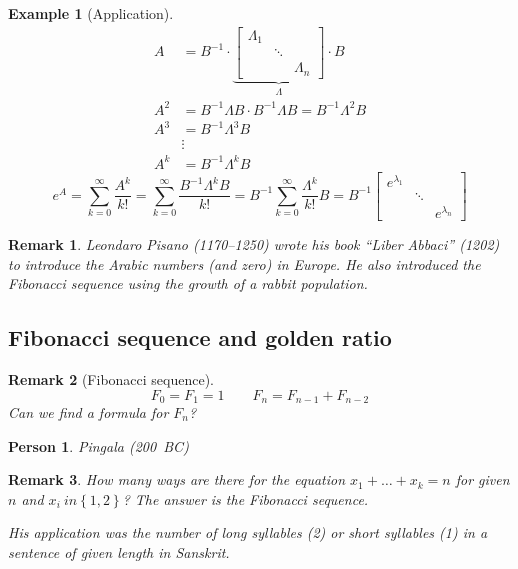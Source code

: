 \documentclass[a4paper]{article}
\numberwithin{lecref}{section}
\newtheorem*{Example}{Example}
\newtheorem*{Remark}{Remark}
\newtheorem*{Person}{Person}
\newcommand{\set}[1]{\left\{#1\right\}}
\begin{document}
\begin{Example}[Application]
  \begin{align*}
    A &= B^{-1} \cdot \underbrace{\begin{bmatrix} \Lambda_1 & & \\ & \ddots & \\ & & \Lambda_n \end{bmatrix}}_{\Lambda} \cdot B \\
    A^2 &= B^{-1} \Lambda B \cdot B^{-1} \Lambda B = B^{-1} \Lambda^2 B \\
    A^3 &= B^{-1} \Lambda^3 B \\
        & \vdots \\
    A^k &= B^{-1} \Lambda^k B
  \end{align*}
  \[ e^A = \sum_{k=0}^\infty \frac{A^k}{k!} = \sum_{k=0}^\infty \frac{B^{-1} \Lambda^k B}{k!} = B^{-1} \sum_{k=0}^\infty \frac{\Lambda^k}{k!} B = B^{-1} \begin{bmatrix} e^{\lambda_1} & & \\ & \ddots & \\ & & e^{\lambda_n} \end{bmatrix} \]
\end{Example}

\begin{Remark}
  Leondaro Pisano (1170--1250) wrote his book \enquote{Liber Abbaci} (1202) to introduce the Arabic numbers (and zero) in Europe.
  He also introduced the Fibonacci sequence using the growth of a rabbit population.
\end{Remark}

\subsection{Fibonacci sequence and golden ratio}

\begin{Remark}[Fibonacci sequence]
  \[ F_0 = F_1 = 1 \qquad F_n = F_{n-1} + F_{n-2} \]
  Can we find a formula for $F_n$?
\end{Remark}

\begin{Person}
  Pingala (200~BC)
\end{Person}

\begin{Remark}
  How many ways are there for the equation $x_1 + \dots + x_k = n$ for given $n$ and $x_i \ in \set{1,2}$?
  The answer is the Fibonacci sequence.

  His application was the number of long syllables (2) or short syllables (1) in a sentence of given length in Sanskrit.
\end{Remark}
\end{document}
